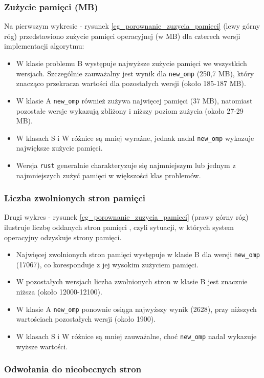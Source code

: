 \subsubsection{Zużycie pamięci (MB)}
Na pierwszym wykresie - rysunek \ref{cg_porownanie_zuzycia_pamieci} (lewy górny róg) przedstawiono zużycie pamięci operacyjnej (w MB) dla czterech wersji implementacji algorytmu:
\begin{itemize}
    \item W klasie problemu B występuje najwyższe zużycie pamięci we wszystkich wersjach. Szczególnie zauważalny jest wynik dla \texttt{new\_omp} (250,7 MB), który znacząco przekracza wartości dla pozostałych wersji (około 185-187 MB).
    \item W klasie A \texttt{new\_omp} również zużywa najwięcej pamięci (37 MB), natomiast pozostałe wersje wykazują zbliżony i niższy poziom zużycia (około 27-29 MB).
    \item W klasach S i W różnice są mniej wyraźne, jednak nadal \texttt{new\_omp} wykazuje największe zużycie pamięci.
    \item Wersja \texttt{rust} generalnie charakteryzuje się najmniejszym lub jednym z najmniejszych zużyć pamięci w większości klas problemów.
\end{itemize}

\subsubsection{Liczba zwolnionych stron pamięci}
Drugi wykres - rysunek \ref{cg_porownanie_zuzycia_pamieci} (prawy górny róg) ilustruje liczbę oddanych stron pamięci , czyli sytuacji, w których system operacyjny odzyskuje strony pamięci.
\begin{itemize}
    \item Najwięcej zwolnionych stron pamięci występuje w klasie B dla wersji \texttt{new\_omp} (17067), co koresponduje z jej wysokim zużyciem pamięci.
    \item W pozostałych wersjach liczba zwolnionych stron w klasie B jest znacznie niższa (około 12000-12100).
    \item W klasie A \texttt{new\_omp} ponownie osiąga najwyższy wynik (2628), przy niższych wartościach pozostałych wersji (około 1900).
    \item W klasach S i W różnice są mniej zauważalne, choć \texttt{new\_omp} nadal wykazuje wyższe wartości.
\end{itemize}

\subsubsection{Odwołania do nieobecnych stron}

